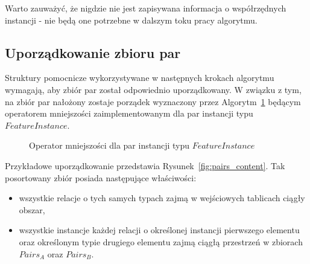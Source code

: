 \documentclass[12pt]{article}
\begin{document}
Warto zauważyć, że nigdzie nie jest zapisywana informacja o współrzędnych instancji - nie będą one potrzebne w dalszym toku pracy algorytmu.

\subsection{Uporządkowanie zbioru par}
\label{subsec:pair_ordering}

Struktury pomocnicze wykorzystywane w następnych krokach algorytmu wymagają, aby zbiór par został odpowiednio uporządkowany. W związku z tym, na zbiór par nałożony zostaje porządek wyznaczony przez Algorytm~\ref{alg:FeatureInstancePair-operator} będącym operatorem mniejszości zaimplementowanym dla par instancji typu $ FeatureInstance $.

\begin{figure}[H]
\begin{algorithm}[H]
\caption{Operator mniejszości dla par instancji typu $ FeatureInstance $}
\label{alg:FeatureInstancePair-operator}
\end{algorithm}
\end{figure}

Przykładowe uporządkowanie przedstawia Rysunek~\ref{fig:pairs_content}. Tak posortowany zbiór posiada następujące właściwości:
\begin{itemize}
\item wszystkie relacje o tych samych typach zajmą w wejściowych tablicach ciągły obszar,
\item wszystkie instancje każdej relacji o określonej instancji pierwszego elementu oraz określonym typie drugiego elementu zajmą ciągłą przestrzeń w zbiorach $ Pairs_{A} $ oraz $ Pairs_{B} $.
\end{itemize}
\end{document}
